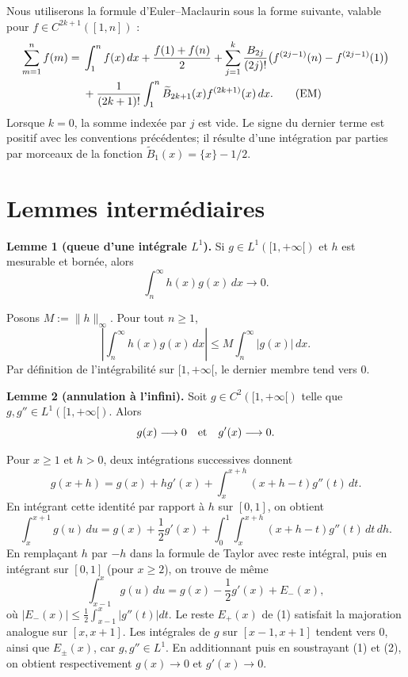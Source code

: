 \documentclass[11pt,a4paper]{article}
\newcommand{\Bper}[1]{\widetilde B_{#1}}
\begin{document}
Nous utiliserons la formule d'Euler--Maclaurin sous la forme suivante, valable
pour $f\in C^{2k+1}([1,n])$ :
\begin{align}
\sum_{m=1}^{n}f(m)
={}&\int_1^n f(x)\,dx+\frac{f(1)+f(n)}2
+\sum_{j=1}^{k}\frac{B_{2j}}{(2j)!}
 \bigl(f^{(2j-1)}(n)-f^{(2j-1)}(1)\bigr) \notag\\
&+\frac1{(2k+1)!}\int_1^n \Bper{2k+1}(x)f^{(2k+1)}(x)\,dx.
\tag{EM}\label{EM}
\end{align}
Lorsque $k=0$, la somme index\'ee par $j$ est vide. Le signe du dernier terme
est positif avec les conventions pr\'ec\'edentes; il r\'esulte d'une int\'egration
par parties par morceaux de la fonction $\Bper1(x)=\{x\}-1/2$.

\section{Lemmes interm\'ediaires}

\begin{lemmabox}
\textbf{Lemme 1 (queue d'une int\'egrale $L^1$).}
Si $g\in L^1([1,+\infty[)$ et $h$ est mesurable et born\'ee, alors
\[
 \int_n^{\infty}h(x)g(x)\,dx\longrightarrow0.
\]
\end{lemmabox}
\begin{proofbox}
Posons $M:=\|h\|_\infty$. Pour tout $n\geq1$,
\[
 \left|\int_n^\infty h(x)g(x)\,dx\right|
 \leq M\int_n^\infty |g(x)|\,dx.
\]
Par d\'efinition de l'int\'egrabilit\'e sur $[1,+\infty[$, le dernier membre
tend vers $0$.
\end{proofbox}

\begin{lemmabox}
\textbf{Lemme 2 (annulation \`a l'infini).}
Soit $g\in C^2([1,+\infty[)$ telle que $g,g''\in L^1([1,+\infty[)$. Alors
\[
 g(x)\longrightarrow0\quad\hbox{et}\quad g'(x)\longrightarrow0.
\]
\end{lemmabox}
\begin{proofbox}
Pour $x\geq1$ et $h>0$, deux int\'egrations successives donnent
\[
 g(x+h)=g(x)+hg'(x)+\int_x^{x+h}(x+h-t)g''(t)\,dt.
\]
En int\'egrant cette identit\'e par rapport \`a $h$ sur $[0,1]$, on obtient
\[
 \int_x^{x+1}g(u)\,du
 =g(x)+\frac12g'(x)
 +\int_0^1\int_x^{x+h}(x+h-t)g''(t)\,dt\,dh. \tag{1}
\]
En rempla\c{c}ant $h$ par $-h$ dans la formule de Taylor avec reste int\'egral,
puis en int\'egrant sur $[0,1]$ (pour $x\geq2$), on trouve de m\^eme
\[
 \int_{x-1}^{x}g(u)\,du
 =g(x)-\frac12g'(x)+E_-(x), \tag{2}
\]
o\`u $|E_-(x)|\leq\frac12\int_{x-1}^{x}|g''(t)|dt$. Le reste $E_+(x)$
de (1) satisfait la majoration analogue sur $[x,x+1]$.
Les int\'egrales de $g$ sur $[x-1,x+1]$ tendent vers $0$, ainsi que $E_\pm(x)$,
car $g,g''\in L^1$. En additionnant puis en soustrayant (1) et (2), on obtient
respectivement $g(x)\to0$ et $g'(x)\to0$.
\end{proofbox}
\end{document}
